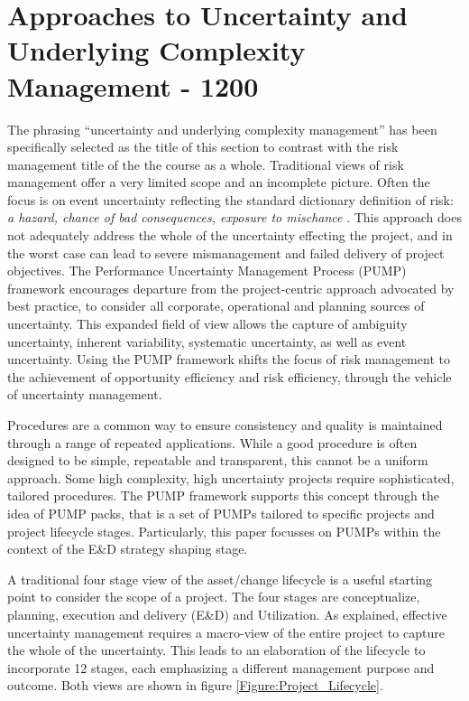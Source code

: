 
\section{Approaches to Uncertainty and Underlying Complexity Management - 1200}


The phrasing ``uncertainty and underlying complexity management'' has been specifically selected as the title of this section to contrast with the risk management title of the the course as a whole.
Traditional views of risk management offer a very limited scope and an incomplete picture.
Often the focus is on event uncertainty reflecting the standard dictionary definition of risk: \textit{a hazard, chance of bad consequences, exposure to mischance} \citep{OED}.
This approach does not adequately address the whole of the uncertainty effecting the project, and in the worst case can lead to severe mismanagement and failed delivery of project objectives.
The Performance Uncertainty Management Process (PUMP) framework encourages departure from the project-centric approach advocated by best practice, to consider all corporate, operational and planning sources of uncertainty.
This expanded field of view allows the capture of ambiguity uncertainty, inherent variability, systematic uncertainty, as well as event uncertainty.
Using the PUMP framework shifts the focus of risk management to the achievement of opportunity efficiency and risk efficiency, through the vehicle of uncertainty management.

Procedures are a common way to ensure consistency and quality is maintained through a range of repeated applications.
While a good procedure is often designed to be simple, repeatable and transparent, this cannot be a uniform approach.
Some high complexity, high uncertainty projects require sophisticated, tailored procedures.
The PUMP framework supports this concept through the idea of PUMP packs, that is a set of PUMPs tailored to specific projects and project lifecycle stages.
Particularly, this paper focusses on PUMPs within the context of the E\&D strategy shaping stage.

A traditional four stage view of the asset/change lifecycle is a useful starting point to consider the scope of a project.
The four stages are conceptualize, planning, execution and delivery (E\&D) and Utilization.
As explained, effective uncertainty management requires a macro-view of the entire project to capture the whole of the uncertainty.
This leads to an elaboration of the lifecycle to incorporate 12 stages, each emphasizing a different management purpose and outcome.
Both views are shown in figure \ref{Figure:Project_Lifecycle}.

